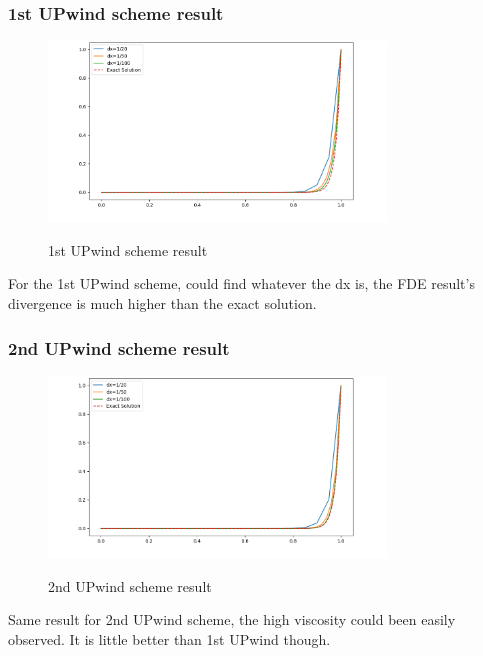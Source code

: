 \documentclass[12pt]{article}
\begin{document}
\subsubsection{1st UPwind scheme result}
\begin{figure}[H]
    \centering
    \includegraphics[width=0.8\textwidth]{figures/P2U1t0.1.png}
    \label{IGs.jpg}
    \caption{1st UPwind scheme result }
\end{figure}

For the 1st UPwind scheme, could find whatever the dx is,
the FDE result's divergence is much higher than the exact 
solution. 

\subsubsection{2nd UPwind scheme result}

\begin{figure}[H]
    \centering
    \includegraphics[width=0.8\textwidth]{figures/P2U2t0.1.png}
    \label{IGs.jpg}
    \caption{2nd UPwind scheme result}
\end{figure}

Same result for 2nd UPwind scheme, the high viscosity 
could been easily observed. It is little better than
1st UPwind though.
\end{document}
